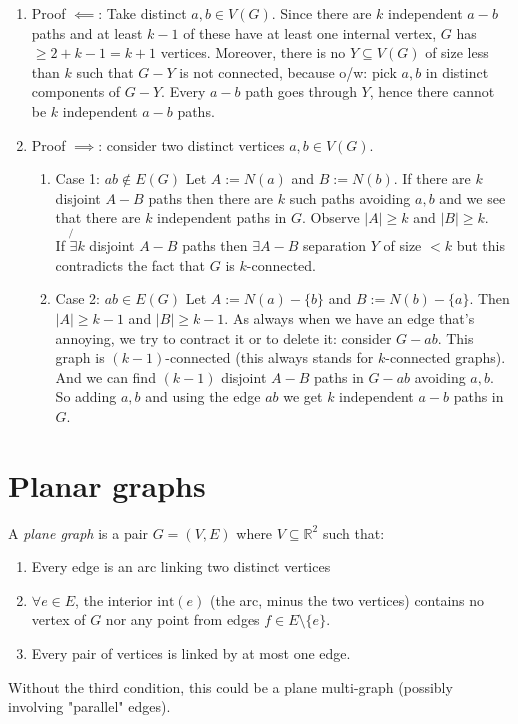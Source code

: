\documentclass[11pt]{book}
\begin{document}
		\begin{enumerate}
			\item Proof $\impliedby$: Take distinct $a ,b \in V(G)$. Since there are $k$ independent $a-b$ paths and at least $k-1$ of these have at least one internal vertex, $G$ has $\geq 2 + k - 1 = k + 1$ vertices. Moreover, there is no $Y \subseteq V(G)$ of size less than $k$ such that $G - Y$ is not connected, because o/w: pick $a,b$ in distinct components of $G - Y$. Every $a-b$ path goes through $Y$, hence there cannot be $k$ independent $a-b$ paths.
			\item Proof $\implies$: consider two distinct vertices $a,b \in V(G)$. 
		\begin{enumerate}
		\item{Case 1: $ab \notin E(G)$}
		Let $A := N(a)$ and $B := N(b)$.
		If there are $k$ disjoint $A-B$ paths then there are $k$ such paths avoiding $a,b$ and we see that there are $k$ independent paths in $G$.  Observe $|A| \geq k$ and $|B| \geq k$.\\
		
		If $\not{\exists} k$ disjoint $A-B$ paths then $\exists A-B$ separation $Y$ of size $< k$ but this contradicts the fact that $G$ is $k$-connected.
		
		\item{Case 2: $ab \in E(G)$}
		Let $A := N(a) - \{b\}$ and $B := N(b) - \{a\}$. Then $|A| \geq k -1$ and $|B| \geq k - 1$. As always when we have an edge that's annoying, we try to contract it or to delete it:  consider  $G - ab$. This graph is $(k-1)$-connected (this always stands for $k$-connected graphs). And we can find $(k-1)$ disjoint $A-B$ paths in $G - ab$ avoiding $a,b$. So adding $a,b$ and using the edge $ab$ we get $k$ independent $a-b$ paths in $G$. 
		\end{enumerate} 
		\end{enumerate}
		
		
\chapter{Planar graphs}
		A \textit{plane graph} is a pair $G = (V,E)$ where $V \subseteq \mathbb{R}^2$ such that:
		\begin{enumerate}
			\item Every edge is an arc linking two distinct vertices
			\item $\forall e \in E$, the interior $\text{int}(e)$ (the arc, minus the two vertices) contains no vertex of $G$ nor any point from edges $f \in E \setminus \{ e \}$.
			\item Every pair of vertices is linked by at most one edge.
		\end{enumerate}
		Without the third condition, this could be a plane multi-graph (possibly involving "parallel" edges).\\
		
\end{document}
